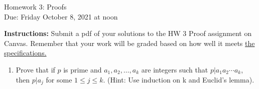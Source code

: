 \documentclass[10pt,a4paper]{article}
\begin{document}
\begin{center}
{\Large Homework 3: Proofs}\\
Due: Friday October 8, 2021 at noon\\


\end{center}
{\bf Instructions:} Submit a pdf of your solutions to the HW 3 Proof assignment on Canvas. Remember that your work will be graded based on how well it meets \href{https://docs.google.com/document/d/1emM06_WRh_h941rsjtRE9fRVndJtfRKd9gyS3Fs_rFA/edit?usp=sharing}{the specifications. }

\begin{enumerate}


\item  Prove that if $p$ is prime and $a_1,a_2,\ldots, a_k$ are integers such that $p|a_1a_2\cdots a_k$, then $p|a_j$ for some $1\le j\le k$.  (Hint: Use induction on k and Euclid's lemma).

\end{enumerate}
\end{document}
